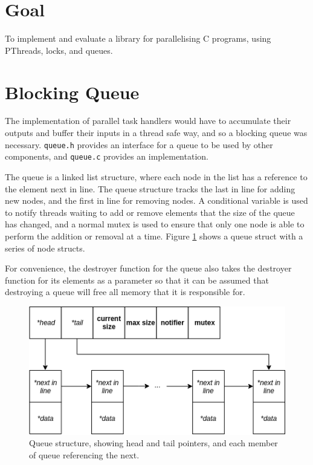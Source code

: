 \documentclass[12pt]{article}
\def\code#1{\texttt{#1}}
\begin{document}
\section*{Goal}

To implement and evaluate a library for parallelising C programs, using PThreads, locks, and queues. 

\section{Blocking Queue}

The implementation of parallel task handlers would have to accumulate their outputs and buffer their inputs in a thread safe way, and so a blocking queue was necessary. \code{queue.h} provides an interface for a queue to be used by other components, and \code{queue.c} provides an implementation.

The queue is a linked list structure, where each node in the list has a reference to the element next in line. The queue structure tracks the last in line for adding new nodes, and the first in line for removing nodes. A conditional variable is used to notify threads waiting to add or remove elements that the size of the queue has changed, and a normal mutex is used to ensure that only one node is able to perform the addition or removal at a time. Figure \ref{fig:queue} shows a queue struct with a series of node structs.

For convenience, the destroyer function for the queue also takes the destroyer function for its elements as a parameter so that it can be assumed that destroying a queue will free all memory that it is responsible for.

\begin{figure}[!ht]
	\centering 
	\includegraphics[width=0.8\linewidth]{images/queue}
	\caption{Queue structure, showing head and tail pointers, and each member of queue referencing the next.}
	\label{fig:queue}
\end{figure}
\end{document}
